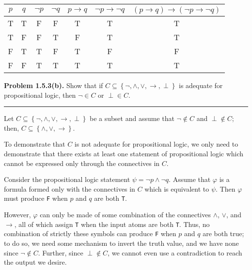 \documentclass{article}
\begin{document}
\begin{table}[h!]
	\begin{tabular}{cc|ccccc}
		$p$ & $q$ & $\lnot p$ & $\lnot q$ & $p \to q$ & $\lnot p \to \lnot q$ & $\left( p \to q \right) \to \left( \lnot p \to \lnot q \right)$ \\ \hline
		T   & T   & F         & F         & T         & T                     & T                                                               \\
		T   & F   & F         & T         & F         & T                     & T                                                               \\
		F   & T   & T         & F         & T         & F                     & F                                                               \\
		F   & F   & T         & T         & T         & T                     & T                                                               \\
	\end{tabular}
\end{table}

\newpage{}

\noindent\textbf{Problem 1.5.3(b).} Show that if $C \subseteq \left\{
	\lnot, \wedge, \vee, \to, \perp \right\}$ is adequate for propositional
logic, then $\lnot \in C$ or $\perp \in C$.

\vspace{0.2cm}
\hrule{}
\vspace{0.2cm}

Let $C \subseteq \left\{ \lnot, \wedge, \vee, \to, \perp \right\}$ be a subset
and assume that $\lnot \not\in C$ and $\perp \not\in C$; then, $C \subseteq
	\left\{ \wedge, \vee, \to \right\}$.

To demonstrate that $C$ is not adequate for propositional logic, we only need
to demonstrate that there exists at least one statement of propositional logic
which cannot be expressed only through the connectives in $C$.

Consider the propositional logic statement $\psi = \lnot p \wedge \lnot q$.
Assume that $\varphi$ is a formula formed only with the connectives in $C$
which is equivalent to $\psi$. Then $\varphi$ must produce \verb|F| when
$p$ and $q$ are both \verb|T|.

However, $\varphi$ can only be made of some combination of the connectives
$\wedge$, $\vee$, and $\to$, all of which assign \verb|T| when the input atoms
are both \verb|T|. Thus, no combination of strictly these symbols can produce
\verb|F| when $p$ and $q$ are both true; to do so, we need some mechanism to
invert the truth value, and we have none since $\lnot \not\in C$. Further,
since $\perp \not\in C$, we cannot even use a contradiction to reach the output
we desire.
\end{document}
